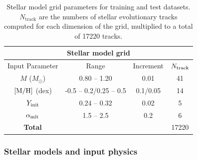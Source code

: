 \documentclass[a4paper,fleqn,usenatbib]{mnras}
\begin{document}
\begin{table}
	\centering
	\caption{Stellar model grid parameters for training and test datasets. $N_\mathrm{track}$ are the numbers of stellar evolutionary tracks computed for each dimension of the grid, multiplied to a total of \num{17220} tracks.}
	\label{tab:grid}
	\begin{tabular}{cccc} %
		\toprule
		\multicolumn{4}{c}{\textbf{Stellar model grid}}\\
		\midrule
		Input Parameter & Range & Increment & $N_{\rm track}$\\
        \midrule
	$M$ ($M_{\odot}$)  & 0.80 -- 1.20 &  0.01& \num{41}\\
        $\rm{[M/H]}$ (dex) & -0.5 -- 0.2/0.25 -- 0.5 & 0.1/0.05 & \num{14}\\
        	$Y_{\rm init}$ & 0.24 -- 0.32 & 0.02 & \num{5}\\
        $\alpha_{\rm{mlt}}$  & 1.5 -- 2.5&  0.2 & \num{6}\\
        \midrule
        \textbf{Total} & & & \num{17220}\\
        \bottomrule
	\end{tabular}
\end{table}

\subsubsection{Stellar models and input physics}\label{subsec:stellar_model}
\end{document}
